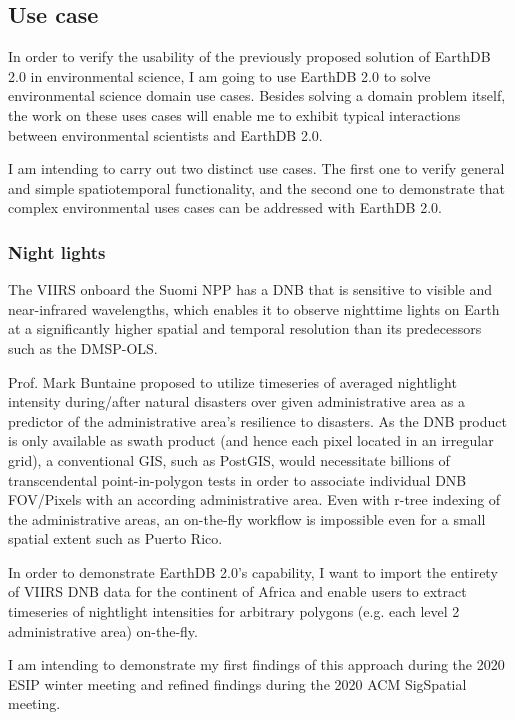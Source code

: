 \documentclass[letterpaper, parskip=half]{scrartcl}
\begin{document}
\newpage



\subsection{Use case}
In order to verify the usability of the previously proposed solution of EarthDB 2.0 in environmental science, I am going to use EarthDB 2.0 to solve environmental science domain use cases. Besides solving a domain problem itself, the work on these uses cases will enable me to exhibit typical interactions between environmental scientists and EarthDB 2.0.

I am intending to carry out two distinct use cases. The first one to verify general and simple spatiotemporal functionality, and the second one to demonstrate that complex environmental uses cases can be addressed with EarthDB 2.0.

\subsubsection{Night lights}
The \gls{VIIRS} onboard the Suomi \gls{NPP} has a \gls{DNB} that is sensitive to visible and near-infrared wavelengths, which enables it to observe nighttime lights on Earth at a significantly higher spatial and temporal resolution than its predecessors such as the \gls{DMSP}-\gls{OLS}. 

Prof. Mark Buntaine proposed to utilize timeseries of averaged nightlight intensity during/after natural disasters over  given administrative area as a predictor of the administrative area's resilience to disasters. 
As the \gls{DNB} product is only available as swath product (and hence each pixel located in an irregular grid), a conventional \gls{GIS}, such as PostGIS, would necessitate billions of transcendental point-in-polygon tests in order to associate individual DNB \gls{FOV}/Pixels with an according administrative area. Even with r-tree indexing of the administrative areas, an on-the-fly workflow is impossible even for a small spatial extent such as Puerto Rico.

In order to demonstrate EarthDB 2.0's capability, I want to import the entirety of \gls{VIIRS} \gls{DNB} data for the continent of Africa and enable users to extract timeseries of nightlight intensities for arbitrary polygons (e.g. each level 2 administrative area) on-the-fly. 

I am intending to demonstrate my first findings of this approach during the 2020 ESIP winter meeting and refined findings during the 2020 ACM SigSpatial meeting.
\end{document}
